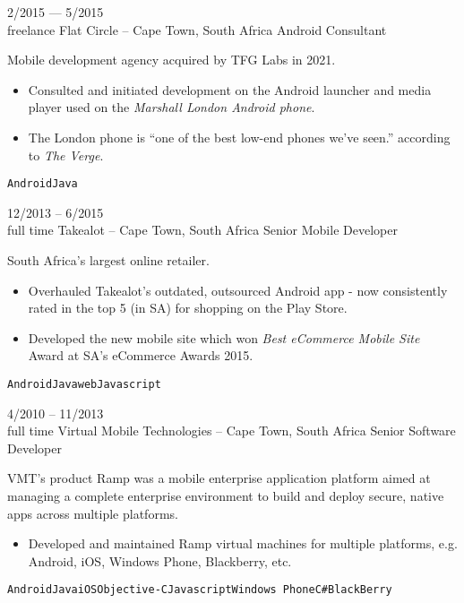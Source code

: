 \documentclass[9pt]{developercv} %
\begin{document}
\begin{entrylist}
	\entry
		{2/2015 --- 5/2015\\\footnotesize{freelance}}
		{Flat Circle {\normalfont\small -- Cape Town, South Africa}}
		{Android Consultant}
        {
            Mobile development agency acquired by TFG Labs in 2021. 
            \begin{itemize}[nosep, leftmargin=*]
                \item Consulted and initiated development on the Android launcher and media player used on the \textit{Marshall London Android phone}.
                \item The London phone is “one of the best low-end phones we've seen.” according to \textit{The Verge}.
            \end{itemize}
    		\texttt{Android}\pipesep\texttt{Java}
        }
        
	\entry
		{12/2013 -- 6/2015\\\footnotesize{full time}}
		{Takealot {\normalfont\small -- Cape Town, South Africa}}
		{Senior Mobile Developer}
		{
            South Africa's largest online retailer.
            \begin{itemize}[nosep, leftmargin=*]
                \item Overhauled Takealot's outdated, outsourced Android app - now consistently rated in the top 5 (in SA) for shopping on the Play Store.
                \item Developed the new mobile site which won \textit{Best eCommerce Mobile Site} Award at SA's eCommerce Awards 2015.
            \end{itemize}
            \texttt{Android}\pipesep\texttt{Java}\pipesep\texttt{web}\pipesep\texttt{Javascript}
        }
  
	\entry
		{4/2010 -- 11/2013\\\footnotesize{full time}}
		{Virtual Mobile Technologies {\normalfont\small -- Cape Town, South Africa}}
		{Senior Software Developer}
		{
            VMT's product Ramp was a mobile enterprise application platform aimed at managing a complete enterprise environment to build and deploy secure, native apps across multiple platforms.
            \begin{itemize}[nosep, leftmargin=*]
                \item Developed and maintained Ramp virtual machines for multiple platforms, e.g. Android, iOS, Windows Phone, Blackberry, etc.
            \end{itemize}
            \texttt{Android}\pipesep\texttt{Java}\pipesep\texttt{iOS}\pipesep\texttt{Objective-C}\pipesep\texttt{Javascript}\pipesep\texttt{Windows Phone}\pipesep\texttt{C\#}\pipesep\texttt{BlackBerry}
        }
 

\end{entrylist}
\end{document}
